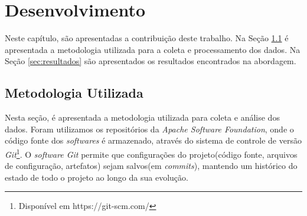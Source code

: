 \chapter{Desenvolvimento}
\label{chapter:desenvolvimento}

Neste capítulo, são apresentadas a contribuição deste trabalho. Na Seção \ref{sec:metodologia} é apresentada a metodologia utilizada para a coleta e processamento dos dados. Na Seção \ref{sec:resultados} são apresentados os resultados encontrados na abordagem.

\section{Metodologia Utilizada} \label{sec:metodologia}


Nesta seção, é apresentada a metodologia utilizada para coleta e análise dos dados. Foram utilizamos os repositórios da \textit{Apache Software Foundation}, onde o código fonte dos \textit{softwares} é armazenado, através do sistema de controle de versão \textit{Git}\footnote{Disponível em https://git-scm.com/}. O \textit{software Git} permite que configurações do projeto(código fonte, arquivos de configuração, artefatos) sejam salvos(em \textit{commits}), mantendo um histórico do estado de todo o projeto ao longo da sua evolução. 

